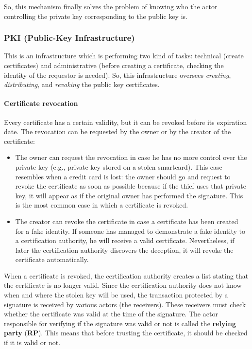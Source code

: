 So, this mechanism finally solves the problem of knowing who the actor controlling the private key corresponding to the public key is.

\subsubsection{PKI (Public-Key Infrastructure)}
This is an infrastructure which is performing two kind of tasks: technical (create certificates) and
administrative (before creating a certificate, checking the identity of the requestor is needed). 
So, this infrastructure oversees \textit{creating}, \textit{distributing}, and \textit{revoking} the public key certificates.


\paragraph{Certificate revocation}
Every certificate has a certain validity, but it can be revoked before its expiration date. The revocation can be requested by the owner or by the creator of the certificate:

\begin{itemize}
    \item The owner can request the revocation in case he has no more control over the private key (e.g., private key stored on a stolen smartcard). 
    This case resembles when a credit card is lost: the owner should go and request to revoke the certificate as soon as possible because if the thief uses that private key, it will appear as if the original owner has performed the signature. This is the most common case in which a certificate is revoked.
    
    \item The creator can revoke the certificate in case a certificate has been created for a fake identity. If someone has managed to demonstrate a fake identity to a certification authority, he will receive a valid certificate. Nevertheless, if later the certification authority discovers the deception, it will revoke the certificate automatically.
\end{itemize}

When a certificate is revoked, the certification authority creates a list stating that the certificate is no longer valid. Since the certification authority does not know when and where the stolen key will be used, the transaction protected by a signature is received by various actors (the receivers). These receivers must check whether the certificate was valid at the time of the signature. The actor responsible for verifying if the signature was valid or not is called the \textbf{relying party} (\textbf{RP}).
This means that before trusting the certificate, it should be checked if it is valid or not.

